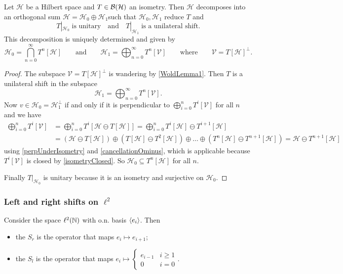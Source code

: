 \begin{theorem}
Let $\mathcal{H}$ be a Hilbert space and $T\in\operatorname{\mathcal{B}}(\mathcal{H})$ an isometry. Then $\mathcal{H}$ decomposes into an orthogonal sum $\mathcal{H} = \mathcal{H}_0\oplus \mathcal{H}_1$such that $\mathcal{H}_0, \mathcal{H}_1$ reduce $T$ and
\[ T|_{\mathcal{H}_0}\;\text{is unitary} \quad\text{and}\quad T|_{\mathcal{H}_1}\;\text{is a unilateral shift}. \]
This decomposition is uniquely determined and given by
\[ \mathcal{H}_0 = \bigcap_{n=0}^\infty T^n[\mathcal{H}] \qquad\text{and}\qquad \mathcal{H}_1 = \bigoplus_{n=0}^\infty T^n[\mathcal{V}] \qquad\text{where}\qquad \mathcal{V} = T[\mathcal{H}]^\perp. \]
\end{theorem}
\begin{proof}
The subspace $\mathcal{V} = T[\mathcal{H}]^\perp$ is wandering by \ref{WoldLemma1}. Then $T$ is a unilateral shift in the subspace
\[ \mathcal{H}_1 = \bigoplus_{n=0}^\infty T^n[\mathcal{V}]. \]
Now $v\in\mathcal{H}_0 = \mathcal{H}_1^\perp$ if and only if it is perpendicular to $\bigoplus_{i=0}^n T^i[\mathcal{V}]$ for all $n$ and we have
\begin{align*}
\bigoplus_{i=0}^n T^i[\mathcal{V}] &= \bigoplus_{i=0}^n T^i[\mathcal{H}\ominus T[\mathcal{H}]] = \bigoplus_{i=0}^n T^i[\mathcal{H}]\ominus T^{i+1}[\mathcal{H}] \\
&= (\mathcal{H}\ominus T[\mathcal{H}])\oplus(T[\mathcal{H}]\ominus T^2[\mathcal{H}])\oplus \ldots \oplus (T^n[\mathcal{H}]\ominus T^{n+1}[\mathcal{H}])  = \mathcal{H} \ominus T^{n+1}[\mathcal{H}] 
\end{align*}
using \ref{perpUnderIsometry} and \ref{cancellationOminus}, which is applicable because $T^i[\mathcal{V}]$ is closed by \ref{isometryClosed}. So $\mathcal{H}_0\subseteq T^n[\mathcal{H}]$ for all $n$.

Finally $T|_{\mathcal{H}_0}$ is unitary because it is an isometry and surjective on $\mathcal{H}_0$.
\end{proof}

\subsubsection{Left and right shifts on $\ell^2$}
\begin{definition}
Consider the space $\ell^2(\mathbb{N})$ with o.n. basis $\left\langle e_i \right\rangle$. Then
\begin{itemize}
\item the  $S_r$ is the operator that maps $e_i \mapsto e_{i+1}$;
\item the  $S_l$ is the operator that maps $e_i \mapsto \begin{cases}
e_{i-1} & i \geq 1 \\ 0 & i = 0
\end{cases}$.
\end{itemize}
\end{definition}

